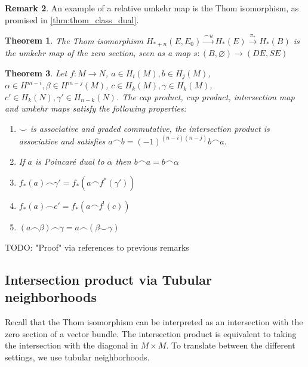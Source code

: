 \documentclass{scrartcl}
\theoremstyle{plain}
\newtheorem{theorem}{Theorem}[section]
\theoremstyle{definition}
\newtheorem{remark}[theorem]{Remark}
\renewcommand{\emptyset}{\varnothing}
\newcommand{\capp}{\mathbin{\frown}}
\newcommand{\cupp}{\mathbin{\smile}}
\begin{document}
\begin{remark}
An example of a relative umkehr map is the Thom isomorphism, as promised in \ref{thm:thom_class_dual}.
\begin{theorem} \label{thm:thom_iso_intersection}
    The Thom isomorphism $H_{*+n}(E, E_0) \xrightarrow{\capp u} H_*(E)\xrightarrow{\pi_*}H_*(B)$ is the umkehr map of the zero section, seen as a map $s\colon (B, \emptyset) \to (DE, SE)$
\end{theorem}
\end{remark}

\begin{theorem} Let $f\colon M\to N$, $a\in H_i(M), b\in H_j(M)$, $\alpha\in H^{m-i}, \beta\in H^{m-j}(M)$, $c\in H_k(M), \gamma\in H_k(M)$, $c'\in H_k(N), \gamma'\in H_{n-k}(N)$. The cap product, cup product, intersection map and umkehr maps satisfy the following properties:
    \begin{enumerate}
        \item $\cupp$ is associative and graded commutative, the intersection product is associative and satisfies $a\capp b = (-1)^{(n-i)(n-j)}b\capp a$.
        \item If $a$ is Poincaré dual to $\alpha$ then $b\capp a = b\capp \alpha$
        \item $f_*(a)\capp \gamma' = f_*(a\capp f^*(\gamma'))$
        \item $f_*(a)\capp c' = f_*(a\capp f^!(c))$
        \item $(a\capp \beta) \capp \gamma = a\capp (\beta\cupp\gamma)$
    \end{enumerate}
\end{theorem}

TODO: "Proof" via references to previous remarks

\subsection{Intersection product via Tubular neighborhoods} \label{subsubsec:intersection_via_tubular_neighborhoods}
Recall that the Thom isomorphism can be interpreted as an intersection with the zero section of a vector bundle. The intersection product is equivalent to taking the intersection with the diagonal in $M\times M$. To translate between the different settings, we use tubular neighborhoods. 
\end{document}
